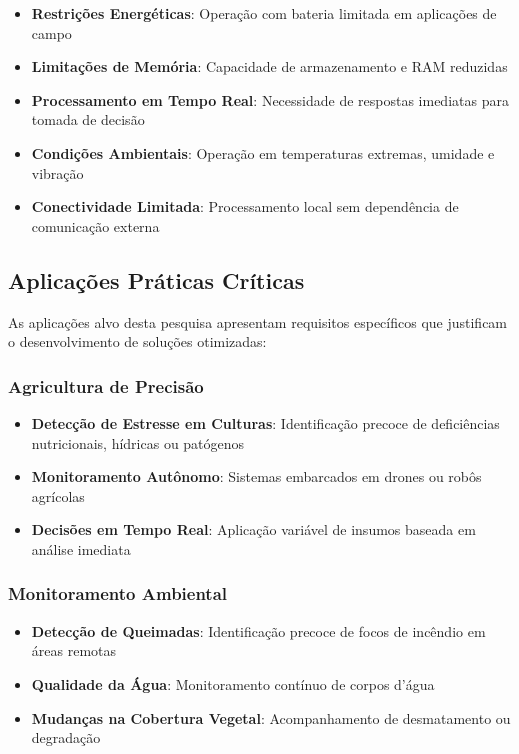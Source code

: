 \begin{itemize}
    \item \textbf{Restrições Energéticas}: Operação com bateria limitada em aplicações de campo
    \item \textbf{Limitações de Memória}: Capacidade de armazenamento e RAM reduzidas
    \item \textbf{Processamento em Tempo Real}: Necessidade de respostas imediatas para tomada de decisão
    \item \textbf{Condições Ambientais}: Operação em temperaturas extremas, umidade e vibração
    \item \textbf{Conectividade Limitada}: Processamento local sem dependência de comunicação externa
\end{itemize}

\subsection{Aplicações Práticas Críticas}
As aplicações alvo desta pesquisa apresentam requisitos específicos que justificam o desenvolvimento de soluções otimizadas:

\subsubsection{Agricultura de Precisão}
\begin{itemize}
    \item \textbf{Detecção de Estresse em Culturas}: Identificação precoce de deficiências nutricionais, hídricas ou patógenos
    \item \textbf{Monitoramento Autônomo}: Sistemas embarcados em drones ou robôs agrícolas
    \item \textbf{Decisões em Tempo Real}: Aplicação variável de insumos baseada em análise imediata
\end{itemize}

\subsubsection{Monitoramento Ambiental}
\begin{itemize}
    \item \textbf{Detecção de Queimadas}: Identificação precoce de focos de incêndio em áreas remotas
    \item \textbf{Qualidade da Água}: Monitoramento contínuo de corpos d'água
    \item \textbf{Mudanças na Cobertura Vegetal}: Acompanhamento de desmatamento ou degradação
\end{itemize}

